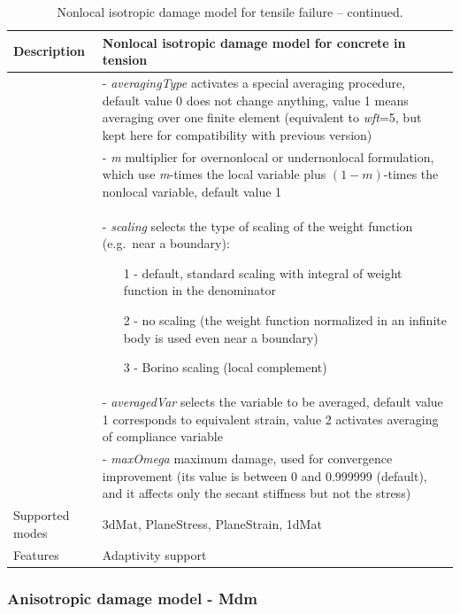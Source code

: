 \documentclass[a4paper]{article}
\newcommand{\param}[1]{{\it #1}}
\begin{document}
\begin{table}[!htb]
\begin{tabular}{|l|p{9cm}|}
\hline
Description & Nonlocal isotropic damage model for concrete in tension\\
\hline
&- \param{averagingType} activates a special averaging procedure, default value 0 does not change anything, value 1 means averaging over one finite element 
(equivalent to {\it wft}=5, but kept here for compatibility with previous version)\\
&- \param{m} multiplier for overnonlocal or undernonlocal formulation, which use
{\em m}-times the local variable plus $(1-m)$-times the nonlocal variable, default value 1\\
&- \param{scaling} selects the type of scaling of the weight function (e.g.\ near a boundary):
\begin{itemize}\setlength{\itemsep}{-3pt}
\item[1 -] default, standard scaling with integral of weight function in the denominator
\item[2 -] no scaling (the weight function normalized in an infinite body is used even near a boundary)
\item[3 -] Borino scaling (local complement)
\end{itemize}\\
&- \param{averagedVar} selects the variable to be averaged, default value 1 corresponds to equivalent strain, value 2 activates averaging of compliance variable\\
&- \param{maxOmega} maximum damage, used for convergence improvement
(its value is between 0 and 0.999999 (default), and it affects only the secant stiffness
but not the stress)\\
Supported modes& 3dMat, PlaneStress, PlaneStrain, 1dMat\\
Features & Adaptivity support\\
\hline
\end{tabular}
\caption{Nonlocal isotropic damage model for tensile failure -- continued.}
\label{idnl_table_cont}
\end{table}

\clearpage

\subsubsection{Anisotropic damage model - Mdm}
\end{document}
